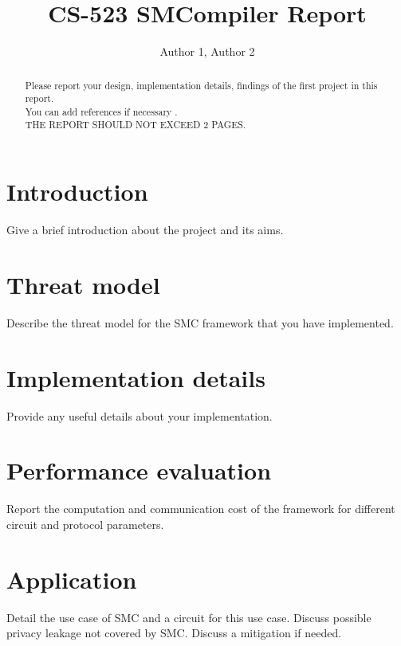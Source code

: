 \documentclass[10pt,conference,compsocconf]{IEEEtran}
\title{CS-523 SMCompiler Report}
\author{Author 1, Author 2}
\date{}
\begin{document}
\maketitle

\begin{abstract}
    Please report your design, implementation details, findings of the first project in this report. \\
    You can add references if necessary \cite{article}. \\
    THE REPORT SHOULD NOT EXCEED 2 PAGES.
\end{abstract}

\section{Introduction}
Give a brief introduction about the project and its aims.

\section{Threat model}
Describe the threat model for the SMC framework that you have implemented.

\section{Implementation details}
Provide any useful details about your implementation.

\section{Performance evaluation}
Report the computation and communication cost of the framework for different circuit and protocol parameters.

\section{Application}
Detail the use case of SMC and a circuit for this use case. Discuss possible privacy leakage not
covered by SMC. Discuss a mitigation if needed.



\end{document}
